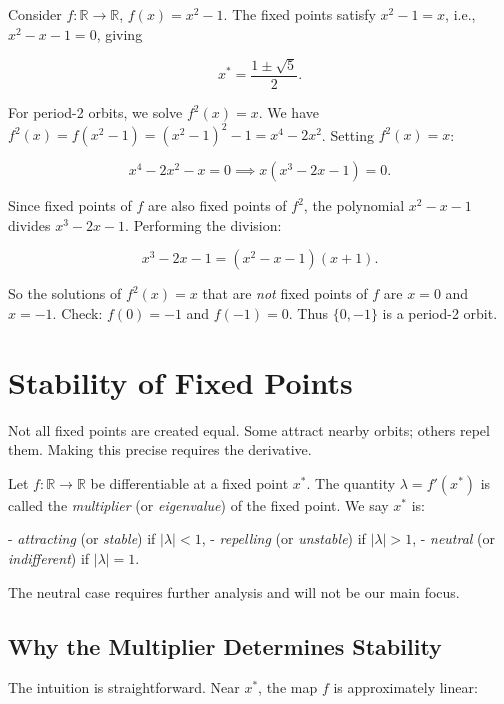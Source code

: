 \begin{example}
Consider $f: \mathbb{R} \to \mathbb{R}$, $f(x) = x^2 - 1$. The fixed points satisfy $x^2 - 1 = x$, i.e., $x^2 - x - 1 = 0$, giving

\[
x^* = \frac{1 \pm \sqrt{5}}{2}.
\]

For period-2 orbits, we solve $f^2(x) = x$. We have $f^2(x) = f(x^2-1) = (x^2 - 1)^2 - 1 = x^4 - 2x^2$. Setting $f^2(x) = x$:

\[
x^4 - 2x^2 - x = 0 \implies x(x^3 - 2x - 1) = 0.
\]

Since fixed points of $f$ are also fixed points of $f^2$, the polynomial $x^2 - x - 1$ divides $x^3 - 2x - 1$. Performing the division:

\[
x^3 - 2x - 1 = (x^2 - x - 1)(x + 1).
\]

So the solutions of $f^2(x) = x$ that are \textit{not} fixed points of $f$ are $x = 0$ and $x = -1$. Check: $f(0) = -1$ and $f(-1) = 0$. Thus $\{0, -1\}$ is a period-2 orbit.
\end{example}


\section{Stability of Fixed Points}\label{sec:2.3}

Not all fixed points are created equal. Some attract nearby orbits; others repel them. Making this precise requires the derivative.

\begin{definition}\label{def:2.7.}
Let $f: \mathbb{R} \to \mathbb{R}$ be differentiable at a fixed point $x^*$. The quantity $\lambda = f'(x^*)$ is called the \textit{multiplier} (or \textit{eigenvalue}) of the fixed point. We say $x^*$ is:

- \textit{attracting} (or \textit{stable}) if $|\lambda| < 1$,
- \textit{repelling} (or \textit{unstable}) if $|\lambda| > 1$,
- \textit{neutral} (or \textit{indifferent}) if $|\lambda| = 1$.

The neutral case requires further analysis and will not be our main focus.
\end{definition}


\subsection{Why the Multiplier Determines Stability}\label{sec:2.3.1}

The intuition is straightforward. Near $x^*$, the map $f$ is approximately linear:

